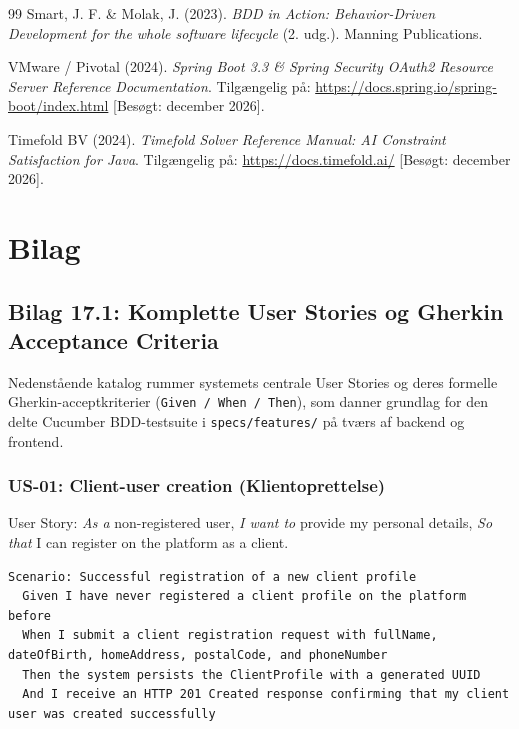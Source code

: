 \documentclass[11pt,a4paper]{article}
\begin{document}
\begin{table}[htbp]
\begin{table}[htbp]
\begin{thebibliography}{99}
Smart, J. F. \& Molak, J. (2023). \textit{BDD in Action: Behavior-Driven Development for the whole software lifecycle} (2. udg.). Manning Publications.

VMware / Pivotal (2024). \textit{Spring Boot 3.3 \& Spring Security OAuth2 Resource Server Reference Documentation}. Tilgængelig på: \url{https://docs.spring.io/spring-boot/index.html} [Besøgt: december 2026].

Timefold BV (2024). \textit{Timefold Solver Reference Manual: AI Constraint Satisfaction for Java}. Tilgængelig på: \url{https://docs.timefold.ai/} [Besøgt: december 2026].

\end{thebibliography}

\newpage
\section{Bilag}

\subsection{Bilag 17.1: Komplette User Stories og Gherkin Acceptance Criteria}
Nedenstående katalog rummer systemets centrale User Stories og deres formelle Gherkin-acceptkriterier (\texttt{Given / When / Then}), som danner grundlag for den delte Cucumber BDD-testsuite i \texttt{specs/features/} på tværs af backend og frontend.

\subsubsection{US-01: Client-user creation (Klientoprettelse)}
User Story: \textit{As a} non-registered user, \textit{I want to} provide my personal details, \textit{So that} I can register on the platform as a client.
\begin{lstlisting}[language={}]
Scenario: Successful registration of a new client profile
  Given I have never registered a client profile on the platform before
  When I submit a client registration request with fullName, dateOfBirth, homeAddress, postalCode, and phoneNumber
  Then the system persists the ClientProfile with a generated UUID
  And I receive an HTTP 201 Created response confirming that my client user was created successfully
\end{lstlisting}


\end{table}
\end{table}
\end{document}
